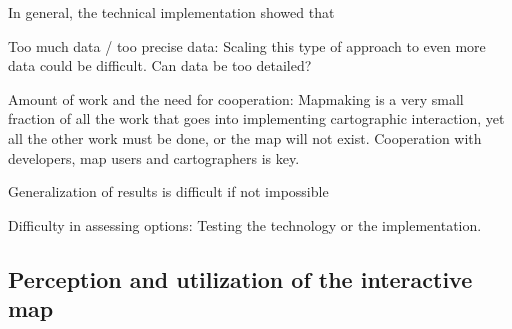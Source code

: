 In general, the technical implementation showed that


Too much data / too precise data:
Scaling this type of approach to even more data could be difficult.
Can data be too detailed?

Amount of work and the need for cooperation:
Mapmaking is a very small fraction of all the work
that goes into implementing cartographic interaction,
yet all the other work must be done,
or the map will not exist.
Cooperation with developers, map users and cartographers is key.


Generalization of results is difficult if not impossible

Difficulty in assessing options: Testing the technology or the implementation.





\subsection{Perception and utilization of the interactive map}

